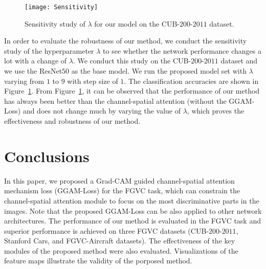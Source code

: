 \documentclass{article}
\begin{document}
\begin{figure}[t]
 \vspace{-2mm}
    \centering 
    \texttt{[image: Sensitivity]}  
    \vspace{-4mm}
    \caption{Sensitivity study of $\lambda$ for our model on the CUB-$200$-$2011$ dataset.}\label{sensi}
\end{figure}

In order to evaluate the robustness of our method, we conduct the sensitivity study of the hyperparameter $\lambda$ to see whether the network performance changes a lot with a change  of $\lambda$. We conduct this study on the CUB-$200$-$2011$ dataset and we use the ResNet$50$ as the base model. We run the proposed model set with $\lambda$ varying from $1$ to $9$ with step size of $1$. The classification accuracies are shown in Figure~\ref{sensi}. From Figure~\ref{sensi}, it  can be observed that the performance of our method has always been better than the channel-spatial attention (without the GGAM-Loss) and does not change much by varying the value of $\lambda$, 
which proves the effectiveness and robustness of our method.

\section{Conclusions}
 
In this paper, we proposed a Grad-CAM guided channel-spatial attention mechanism loss (GGAM-Loss) for the FGVC task, which can constrain the channel-spatial attention module to focus on the most discriminative parts in the images. Note that the proposed GGAM-Loss can be also applied to other network architectures. The performance of our method is evaluated in the FGVC task and superior performance is achieved on three FGVC datasets (CUB-$200$-$2011$, Stanford Cars, and FGVC-Aircraft datasets). The effectiveness of the key modules of the proposed method were also evaluated. Visualizations of the feature maps illustrate the validity of the porposed method.



\end{document}
